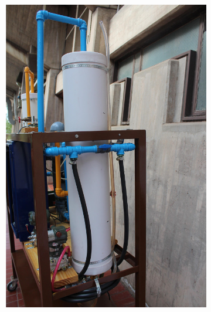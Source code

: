 \begin{figure}[ht]
        \centering
        \begin{subfigure}[b]{0.36\textwidth}
\includegraphics[width=\textwidth]
	{Cap2-DisenoEnsamblado/images/caneria1.JPG}
        \end{subfigure}%
        \hfil
        \begin{subfigure}[b]{0.36\textwidth}

\end{subfigure}
\end{figure}
